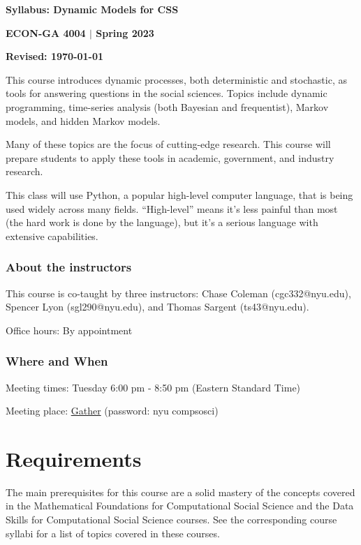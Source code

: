 \documentclass[12pt,pdftex,twoside,letterpaper]{exam}
\begin{document}
  \centerline{\Large\bf Syllabus: Dynamic Models for CSS}
  \vspace{3mm}
  \centerline{\large\bf ECON-GA 4004 $|$ Spring 2023}
  \vspace{3mm}
  \centerline{\bf Revised: \today}

  \bigskip

  This course introduces dynamic processes, both deterministic and stochastic, as tools for
  answering questions in the social sciences. Topics include dynamic programming, time-series
  analysis (both Bayesian and frequentist), Markov models, and hidden Markov models.

  Many of these topics are the focus of cutting-edge research. This course will prepare students to
  apply these tools in academic, government, and industry research.

  This class will use Python, a popular high-level computer language, that is being used widely
  across many fields. ``High-level'' means it's less painful than most (the hard work is done by
  the language), but it's a serious language with extensive capabilities.

  \subsubsection*{About the instructors}

    This course is co-taught by three instructors: Chase Coleman (cgc332@nyu.edu), Spencer Lyon
    (sgl290@nyu.edu), and Thomas Sargent (ts43@nyu.edu).

    Office hours: By appointment

  \subsubsection*{Where and When}

    Meeting times: Tuesday 6:00 pm - 8:50 pm (Eastern Standard Time)

    Meeting place: \href{https://app.gather.town/app/70NVJBXquyIwqiOL/NYU%20CSS}{Gather} (password: nyu compsosci)

  \section*{Requirements}

    The main prerequisites for this course are a solid mastery of the concepts covered in the
    Mathematical Foundations for Computational Social Science and the Data Skills for Computational
    Social Science courses. See the corresponding course syllabi for a list of topics covered in
    these courses.
\end{document}
